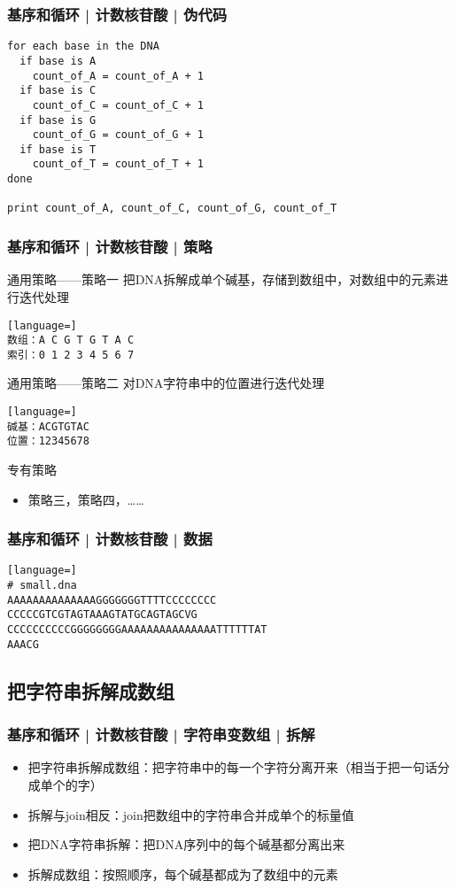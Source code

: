 \begin{frame}[fragile]
  \frametitle{基序和循环 | 计数核苷酸 | 伪代码}
\begin{lstlisting}
for each base in the DNA
  if base is A
    count_of_A = count_of_A + 1
  if base is C
    count_of_C = count_of_C + 1
  if base is G
    count_of_G = count_of_G + 1
  if base is T
    count_of_T = count_of_T + 1
done

print count_of_A, count_of_C, count_of_G, count_of_T
\end{lstlisting}
\end{frame}

\begin{frame}[fragile]
  \frametitle{基序和循环 | 计数核苷酸 | 策略}
  \begin{block}{通用策略——策略一}
    把DNA拆解成单个碱基，存储到数组中，对数组中的元素进行迭代处理
\begin{lstlisting}[language=]
数组：A C G T G T A C
索引：0 1 2 3 4 5 6 7
\end{lstlisting}
  \end{block}
  \pause
  \vspace{-0.5em}
  \begin{block}{通用策略——策略二}
    对DNA字符串中的位置进行迭代处理
\begin{lstlisting}[language=]
碱基：ACGTGTAC
位置：12345678
\end{lstlisting}
  \end{block}
  \pause
  \vspace{-0.5em}
  \begin{block}{专有策略}
    \begin{itemize}
      \item 策略三，策略四，……
    \end{itemize}
  \end{block}
\end{frame}

\begin{frame}[fragile]
  \frametitle{基序和循环 | 计数核苷酸 | 数据}
\begin{lstlisting}[language=]
# small.dna
AAAAAAAAAAAAAAGGGGGGGTTTTCCCCCCCC
CCCCCGTCGTAGTAAAGTATGCAGTAGCVG
CCCCCCCCCCGGGGGGGGAAAAAAAAAAAAAAATTTTTTAT
AAACG
\end{lstlisting}
\end{frame}

\subsection{把字符串拆解成数组}
\begin{frame}
  \frametitle{基序和循环 | 计数核苷酸 | 字符串变数组 | 拆解}
  \begin{itemize}
    \item 把字符串拆解成数组：把字符串中的每一个字符分离开来（相当于把一句话分成单个的字）
    \item 拆解与join相反：join把数组中的字符串合并成单个的标量值
    \item 把DNA字符串拆解：把DNA序列中的每个碱基都分离出来
    \item 拆解成数组：按照顺序，每个碱基都成为了数组中的元素
  \end{itemize}
\end{frame}


